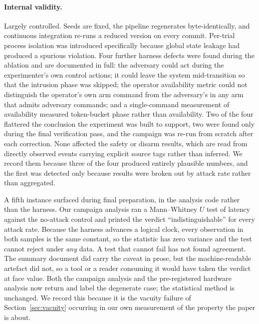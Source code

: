 \paragraph{Internal validity.} Largely controlled. Seeds are fixed, the pipeline regenerates
byte-identically, and continuous integration re-runs a reduced version on every commit.
Per-trial process isolation was introduced specifically because global state leakage had produced
a spurious violation. Four further harness defects were found during the ablation and
are documented in full: the adversary could act during the experimenter's own control actions;
it could leave the system mid-transition so that the intrusion phase was skipped; the operator
availability metric could not distinguish the operator's own arm command from the adversary's
in any arm that admits adversary commands; and a single-command measurement of availability
measured token-bucket phase rather than availability. Two of the four flattered the conclusion
the experiment was built to support, two were found only during the final verification pass,
and the campaign was re-run from scratch after each correction. None affected the safety or
disarm results, which are read from directly observed events carrying explicit source tags
rather than inferred. We record them because three of the four produced entirely plausible
numbers, and the first was detected only because results were broken out by attack rate rather
than aggregated.

A fifth instance surfaced during final preparation, in the analysis code rather than the harness.
Our campaign analysis ran a Mann--Whitney $U$ test of latency against the no-attack control and
printed the verdict ``indistinguishable'' for every attack rate. Because the harness advances a
logical clock, every observation in both samples is the same constant, so the statistic has zero
variance and the test cannot reject under \emph{any} data. A test that cannot fail has not found
agreement. The summary document did carry the caveat in prose, but the machine-readable artefact
did not, so a tool or a reader consuming it would have taken the verdict at face value. Both the
campaign analysis and the pre-registered hardware analysis now return and label the degenerate
case; the statistical method is unchanged. We record this because it is the vacuity failure of
Section~\ref{sec:vacuity} occurring in our own measurement of the property the paper is about.

